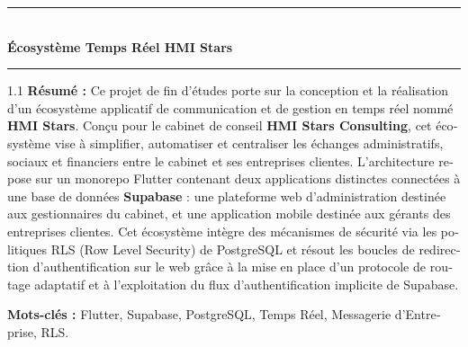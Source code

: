 \documentclass[12pt,a4paper,oneside]{report}
\begin{document}











\tableofcontents
\listoffigures
\listoftables




\clearpage
{}

















\clearpage

\thispagestyle{empty}
\vspace*{\fill}
\begin{center}
    \rule{\textwidth}{1.5pt} \\
    \vspace{0.4cm}
    {\large\bfseries Écosystème Temps Réel HMI Stars} \\
    \rule{\textwidth}{1.5pt}
\end{center}

\vspace{0.5cm}

\begin{otherlanguage}{french}
\begin{spacing}{1.1}
\noindent \textbf{Résumé : } 
Ce projet de fin d'études porte sur la conception et la réalisation d'un écosystème applicatif de communication et de gestion en temps réel nommé \textbf{HMI Stars}. Conçu pour le cabinet de conseil \textbf{HMI Stars Consulting}, cet écosystème vise à simplifier, automatiser et centraliser les échanges administratifs, sociaux et financiers entre le cabinet et ses entreprises clientes. L'architecture repose sur un monorepo Flutter contenant deux applications distinctes connectées à une base de données \textbf{Supabase} : une plateforme web d'administration destinée aux gestionnaires du cabinet, et une application mobile destinée aux gérants des entreprises clientes. Cet écosystème intègre des mécanismes de sécurité via les politiques RLS (Row Level Security) de PostgreSQL et résout les boucles de redirection d'authentification sur le web grâce à la mise en place d'un protocole de routage adaptatif et à l'exploitation du flux d'authentification implicite de Supabase.

\noindent \textbf{Mots-clés : } Flutter, Supabase, PostgreSQL, Temps Réel, Messagerie d'Entreprise, RLS.
\end{spacing}
\end{otherlanguage}
\end{document}
